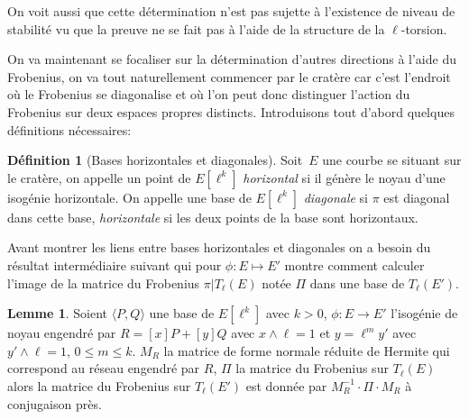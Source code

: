 \documentclass[10pt,a4paper]{book}
\theoremstyle{plain}
\theoremstyle{definition}
\newtheorem{lem}[thm]{Lemme}
\theoremstyle{definition}
\theoremstyle{definition}
\theoremstyle{definition}
\newtheorem{defi}[thm]{Définition}
\theoremstyle{remark}
\theoremstyle{remark}
\theoremstyle{definition}
\begin{document}
On voit aussi que cette détermination n'est pas sujette à l'existence de niveau
de stabilité vu que la preuve ne se fait pas à l'aide de la structure de la 
$\ell$-torsion.

On va maintenant se focaliser sur la détermination d'autres directions à l'aide
du Frobenius, on va tout naturellement commencer par le cratère car c'est 
l'endroit où le Frobenius se diagonalise et où l'on peut donc distinguer 
l'action du Frobenius sur deux espaces propres distincts. Introduisons tout 
d'abord quelques définitions nécessaires:


\begin{defi}[Bases horizontales et diagonales]
  Soit~$E$ une courbe se situant sur le cratère, 
  on appelle un point de $E[\ell^k]$ \emph{horizontal} 
  si il génère le noyau d'une isogénie horizontale. 
  On appelle une base de $E[\ell^k]$ \emph{diagonale} 
  si $\pi$ est diagonal dans cette base, \emph{horizontale} si 
  les deux points de la base sont horizontaux.
\end{defi}

Avant montrer les liens entre bases horizontales et diagonales on a besoin du résultat intermédiaire suivant qui pour $\phi:E \mapsto E'$ montre comment calculer l'image de la matrice du Frobenius $\pi|T_{\ell}(E)$ notée $\Pi$ dans une base de $T_{\ell}(E')$.

\begin{lem}
\label{lem:iso:con}
Soient $\langle P, Q \rangle$ une base de $E[\ell^k]$ avec $k>0$, $\phi:E 
\rightarrow E'$ l'isogénie de noyau engendré par $R=[x]P+[y]Q$  avec $x\wedge 
\ell =1$ et $y=\ell^my'$ avec $y' \wedge \ell =1$, $0 \leqslant m \leqslant k$.
$M_R$ la matrice de forme normale réduite de Hermite qui correspond au réseau 
engendré par $R$,  $\Pi$ la matrice du Frobenius sur $T_{\ell}(E)$ alors la 
matrice du Frobenius sur $T_{\ell}(E')$ est donnée par $M_R^{-1} \cdot \Pi 
\cdot M_R$ à conjugaison près.
\end{lem}
\end{document}
